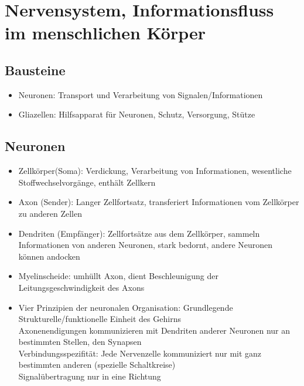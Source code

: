 \documentclass[a4paper,10pt,oneside]{article}
\begin{document}
\section{Nervensystem, Informationsfluss im menschlichen Körper}

\subsection{Bausteine}
\begin{itemize}
	\item Neuronen: Transport und Verarbeitung von Signalen/Informationen
	\item Gliazellen: Hilfsapparat für Neuronen, Schutz, Versorgung, Stütze
\end{itemize}


\subsection{Neuronen}
\begin{itemize}
	\item Zellkörper(Soma): Verdickung, Verarbeitung von Informationen, wesentliche Stoffwechselvorgänge, enthält Zellkern
	\item Axon (Sender): Langer Zellfortsatz, transferiert Informationen vom Zellkörper zu anderen Zellen
	\item Dendriten (Empfänger): Zellfortsätze aus dem Zellkörper, sammeln Informationen von anderen Neuronen, stark bedornt, andere Neuronen können andocken
	\item Myelinscheide: umhüllt Axon, dient Beschleunigung der Leitungsgeschwindigkeit des Axons
	\item Vier Prinzipien der neuronalen Organisation:
	Grundlegende Strukturelle/funktionelle Einheit des Gehirns \\
	Axonenendigungen kommunizieren mit Dendriten anderer Neuronen nur an bestimmten Stellen, den Synapsen \\
	Verbindungsspezifität: Jede Nervenzelle kommuniziert nur mit ganz bestimmten anderen (spezielle Schaltkreise) \\
	Signalübertragung nur in eine Richtung
\end{itemize}
\end{document}
